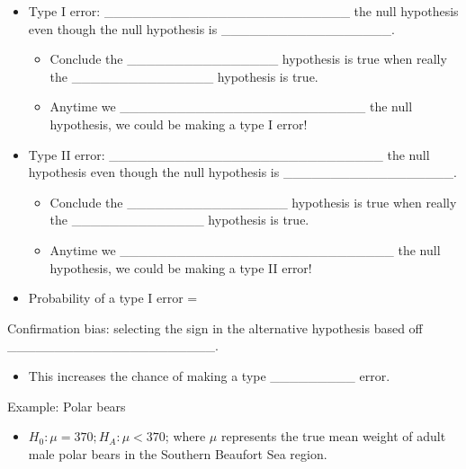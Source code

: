 \documentclass[
]{report}
\providecommand{\tightlist}{%
  \setlength{\itemsep}{0pt}\setlength{\parskip}{0pt}}
\begin{document}
\begin{itemize}
\item
  Type I error: \_\_\_\_\_\_\_\_\_\_\_\_\_\_\_\_\_\_\_\_\_\_\_\_\_\_ the null hypothesis even though the null hypothesis is \_\_\_\_\_\_\_\_\_\_\_\_\_\_\_\_\_\_.

  \begin{itemize}
  \item
    Conclude the \_\_\_\_\_\_\_\_\_\_\_\_\_\_\_\_ hypothesis is true when really the \_\_\_\_\_\_\_\_\_\_\_\_\_\_\_
    hypothesis is true.
  \item
    Anytime we \_\_\_\_\_\_\_\_\_\_\_\_\_\_\_\_\_\_\_\_\_\_\_\_\_\_ the null hypothesis, we could be making a type I error!
  \end{itemize}
\item
  Type II error: \_\_\_\_\_\_\_\_\_\_\_\_\_\_\_\_\_\_\_\_\_\_\_\_\_\_\_\_\_ the null hypothesis even though the null hypothesis is \_\_\_\_\_\_\_\_\_\_\_\_\_\_\_\_\_\_.

  \begin{itemize}
  \item
    Conclude the \_\_\_\_\_\_\_\_\_\_\_\_\_\_\_\_\_ hypothesis is true when really the \_\_\_\_\_\_\_\_\_\_\_\_\_\_
    hypothesis is true.
  \item
    Anytime we \_\_\_\_\_\_\_\_\_\_\_\_\_\_\_\_\_\_\_\_\_\_\_\_\_\_\_\_\_ the null hypothesis, we could be making a type II error!
  \end{itemize}
\item
  Probability of a type I error =
\end{itemize}

Confirmation bias: selecting the sign in the alternative hypothesis based off \_\_\_\_\_\_\_\_\_\_\_\_\_\_\_\_\_\_\_\_\_\_.

\begin{itemize}
\tightlist
\item
  This increases the chance of making a type \_\_\_\_\_\_\_\_\_ error.
\end{itemize}


Example: Polar bears

\begin{itemize}
\tightlist
\item
  \(H_0:\mu=370; H_A:\mu <370\); where \(\mu\) represents the true mean weight of adult male polar bears in the Southern Beaufort Sea region.
\end{itemize}
\end{document}
